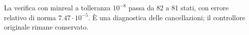 La verifica con minreal a tolleranza $10^{-8}$ passa da 82 a 81 stati, con errore relativo di norma $7.47\cdot10^{-5}$. È una diagnostica delle cancellazioni; il controllore originale rimane conservato.

